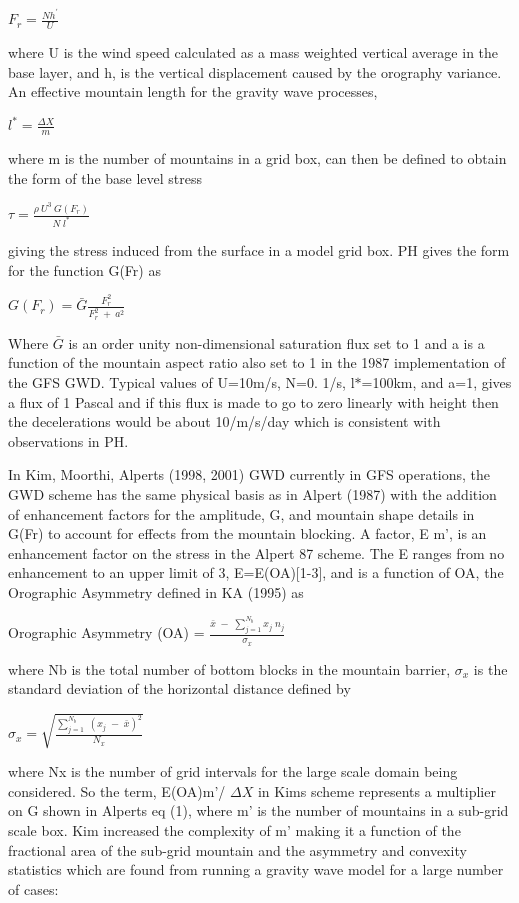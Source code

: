 $ F_{r} = \frac{N h^{'}}{U} $

where U is the wind speed calculated as a mass weighted vertical average in the base layer, and h\textquotesingle{}, is the vertical displacement caused by the orography variance. An effective mountain length for the gravity wave processes,

$ l^{*} = \frac{\Delta X}{m} $

where m is the number of mountains in a grid box, can then be defined to obtain the form of the base level stress

$ \tau = \frac {\rho \: U^{3} \: G(F_{r})} {N \;l^{*}} $

giving the stress induced from the surface in a model grid box. PH gives the form for the function G(\+Fr) as

$ G(F_{r}) = \bar{G}\frac{F^{2}_{r}}{F^{2}_{r}\: + \:a^{2}} $

Where $ \bar{G} $ is an order unity non-\/dimensional saturation flux set to 1 and \textquotesingle{}a\textquotesingle{} is a function of the mountain aspect ratio also set to 1 in the 1987 implementation of the G\+FS G\+WD. Typical values of U=10m/s, N=0. 1/s, l$\ast$=100km, and a=1, gives a flux of 1 Pascal and if this flux is made to go to zero linearly with height then the decelerations would be about 10/m/s/day which is consistent with observations in PH.

In Kim, Moorthi, Alpert\textquotesingle{}s (1998, 2001) G\+WD currently in G\+FS operations, the G\+WD scheme has the same physical basis as in Alpert (1987) with the addition of enhancement factors for the amplitude, G, and mountain shape details in G(\+Fr) to account for effects from the mountain blocking. A factor, E m’, is an enhancement factor on the stress in the Alpert \textquotesingle{}87 scheme. The E ranges from no enhancement to an upper limit of 3, E=E(\+O\+A)\mbox{[}1-\/3\mbox{]}, and is a function of OA, the Orographic Asymmetry defined in KA (1995) as

Orographic Asymmetry (OA) = $ \frac{ \bar{x} \; - \; \sum\limits_{j=1}^{N_{b}} x_{j} \; n_{j} }{\sigma_{x}} $

where Nb is the total number of bottom blocks in the mountain barrier, $ \sigma_{x} $ is the standard deviation of the horizontal distance defined by

$ \sigma_{x} = \sqrt{ \frac{\sum\limits_{j=1}^{N_{b}} \; (x_{j} \; - \; \bar{x} )^2}{N_{x}} } $

where Nx is the number of grid intervals for the large scale domain being considered. So the term, E(\+O\+A)m’/ $ \Delta X $ in Kim\textquotesingle{}s scheme represents a multiplier on G shown in Alpert\textquotesingle{}s eq (1), where m’ is the number of mountains in a sub-\/grid scale box. Kim increased the complexity of m’ making it a function of the fractional area of the sub-\/grid mountain and the asymmetry and convexity statistics which are found from running a gravity wave model for a large number of cases\+:

